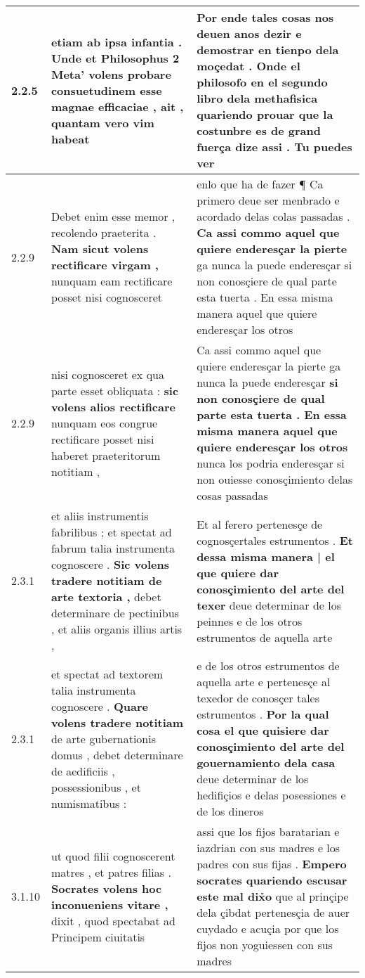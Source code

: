 \begin{tabular}{|p{1cm}|p{6.5cm}|p{6.5cm}|}
2.2.5 & etiam ab ipsa infantia . Unde et Philosophus 2 Meta’ \textbf{ volens probare } consuetudinem esse magnae efficaciae , ait , quantam vero vim habeat & Por ende tales cosas nos deuen anos dezir e demostrar en tienpo dela moçedat . Onde el philosofo en el segundo libro dela \textbf{ methafisica quariendo prouar } que la costunbre es de grand fuerça dize assi . Tu puedes ver \\\hline
2.2.9 & Debet enim esse memor , recolendo praeterita . \textbf{ Nam sicut volens rectificare virgam , } nunquam eam rectificare posset nisi cognosceret & enlo que ha de fazer ¶ Ca primero deue ser menbrado e acordado delas colas passadas . \textbf{ Ca assi commo aquel que quiere enderesçar la pierte } ga nunca la puede enderesçar si non conosçiere de qual parte esta tuerta . En essa misma manera aquel que quiere enderesçar los otros \\\hline
2.2.9 & nisi cognosceret ex qua parte esset obliquata : \textbf{ sic volens alios rectificare } nunquam eos congrue rectificare posset nisi haberet praeteritorum notitiam , & Ca assi commo aquel que quiere enderesçar la pierte ga nunca la puede enderesçar \textbf{ si non conosçiere de qual parte esta tuerta . En essa misma manera aquel que quiere enderesçar los otros } nunca los podria enderesçar si non ouiesse conosçimiento delas cosas passadas \\\hline
2.3.1 & et aliis instrumentis fabrilibus ; et spectat ad fabrum talia instrumenta cognoscere . \textbf{ Sic volens tradere notitiam de arte textoria , } debet determinare de pectinibus , et aliis organis illius artis , & Et al ferero pertenesçe de cognosçertales estrumentos . \textbf{ Et dessa misma manera | el que quiere dar conosçimiento del arte del texer } deue determinar de los peinnes e de los otros estrumentos de aquella arte \\\hline
2.3.1 & et spectat ad textorem talia instrumenta cognoscere . \textbf{ Quare volens tradere notitiam } de arte gubernationis domus , debet determinare de aedificiis , possessionibus , et numismatibus : & e de los otros estrumentos de aquella arte e pertenesçe al texedor de conosçer tales estrumentos . \textbf{ Por la qual cosa el que quisiere dar conosçimiento del arte del gouernamiento dela casa } deue determinar de los hedifiçios e delas posessiones e de los dineros \\\hline
3.1.10 & ut quod filii cognoscerent matres , et patres filias . \textbf{ Socrates volens hoc inconueniens vitare , } dixit , quod spectabat ad Principem ciuitatis & assi que los fijos baratarian e iazdrian con sus madres e los padres con sus fijas . \textbf{ Empero socrates quariendo escusar este mal dix̉o } que al prinçipe dela çibdat pertenesçia de auer cuydado e acuçia por que los fijos non yoguiessen con sus madres \\\hline

\end{tabular}
